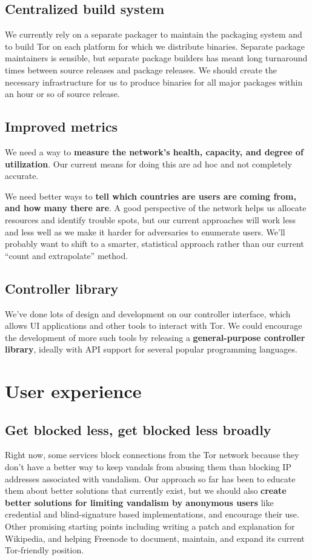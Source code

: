 \documentclass{article}
\newcommand{\tmp}[1]{{\bf #1} [......] \\}
\begin{document}
\subsection{Centralized build system}
We currently rely on a separate packager to maintain the packaging system and
to build Tor on each platform for which we distribute binaries.  Separate
package maintainers is sensible, but separate package builders has meant
long turnaround times between source releases and package releases.  We
should create the necessary infrastructure for us to produce binaries for all
major packages within an hour or so of source release.

\subsection{Improved metrics}
We need a way to {\bf measure the network's health, capacity, and degree of
  utilization}.  Our current means for doing this are ad hoc and not
completely accurate.

We need better ways to {\bf tell which countries are users are coming from,
  and how many there are}.  A good perspective of the network helps us
allocate resources and identify trouble spots, but our current approaches
will work less and less well as we make it harder for adversaries to
enumerate users.  We'll probably want to shift to a smarter, statistical
approach rather than our current ``count and extrapolate'' method.


\subsection{Controller library}
We've done lots of design and development on our controller interface, which
allows UI applications and other tools to interact with Tor.  We could
encourage the development of more such tools by releasing a {\bf
  general-purpose controller library}, ideally with API support for several
popular programming languages.

\section{User experience}

\subsection{Get blocked less, get blocked less broadly}
Right now, some services block connections from the Tor network because
they don't have a better
way to keep vandals from abusing them than blocking IP addresses associated
with vandalism.  Our approach so far has been to educate them about better
solutions that currently exist, but we should also {\bf create better
solutions for limiting vandalism by anonymous users} like credential and
blind-signature based implementations, and encourage their use. Other
promising starting points including writing a patch and explanation for
Wikipedia, and helping Freenode to document, maintain, and expand its
current Tor-friendly position.
\end{document}
